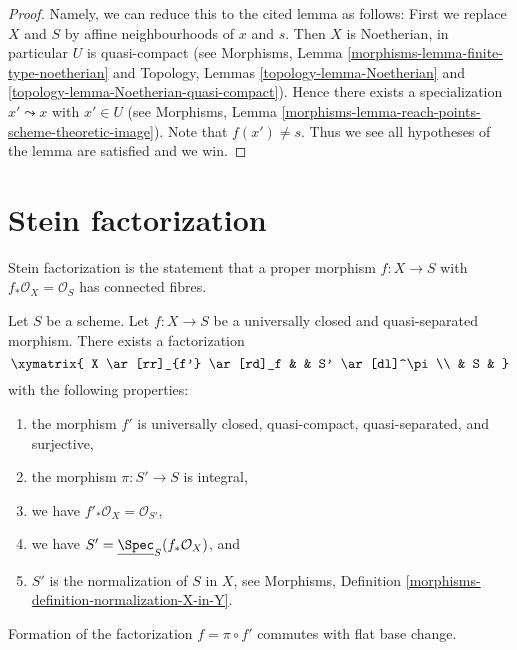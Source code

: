 \begin{proof}
Namely, we can reduce this to the cited lemma as follows: First we
replace $X$ and $S$ by affine neighbourhoods of $x$ and $s$. Then $X$ is
Noetherian, in particular $U$ is quasi-compact (see
Morphisms, Lemma \ref{morphisms-lemma-finite-type-noetherian}
and
Topology, Lemmas \ref{topology-lemma-Noetherian} and
\ref{topology-lemma-Noetherian-quasi-compact}).
Hence there exists a specialization $x' \leadsto x$ with $x' \in U$ (see
Morphisms, Lemma \ref{morphisms-lemma-reach-points-scheme-theoretic-image}).
Note that $f(x') \not = s$. Thus we see all hypotheses of the lemma
are satisfied and we win.
\end{proof}



\section{Stein factorization}
\label{section-stein-factorization}

\noindent
Stein factorization is the statement that a proper morphism $f : X \to S$
with $f_*\mathcal{O}_X = \mathcal{O}_S$ has connected fibres.

\begin{lemma}
\label{lemma-stein-universally-closed}
Let $S$ be a scheme. Let $f : X \to S$ be a universally closed and
quasi-separated morphism. There exists a factorization
$$
\xymatrix{
X \ar[rr]_{f'} \ar[rd]_f & & S' \ar[dl]^\pi \\
& S &
}
$$
with the following properties:
\begin{enumerate}
\item the morphism $f'$ is universally closed, quasi-compact, quasi-separated,
and surjective,
\item the morphism $\pi : S' \to S$ is integral,
\item we have $f'_*\mathcal{O}_X = \mathcal{O}_{S'}$,
\item we have $S' = \underline{\Spec}_S(f_*\mathcal{O}_X)$, and
\item $S'$ is the normalization of $S$ in $X$, see
Morphisms, Definition \ref{morphisms-definition-normalization-X-in-Y}.
\end{enumerate}
Formation of the factorization $f = \pi \circ f'$ commutes
with flat base change.
\end{lemma}

